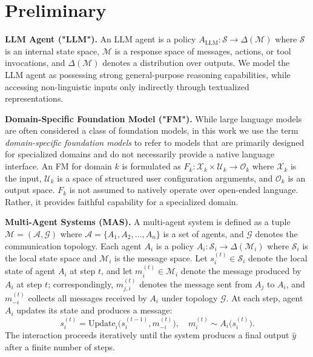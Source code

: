 \documentclass{llmxive}
\begin{document}
{\section{Preliminary}

\textbf{LLM Agent ("LLM").} An LLM agent \cite{DBLP:journals/fcsc/WangMFZYZCTCLZWW24, DBLP:journals/corr/abs-2503-21460} is a policy
$A_{\mathrm{LLM}} : \mathcal{S} \to \Delta(\mathcal{M})$
where $\mathcal{S}$ is an internal state space, $\mathcal{M}$ is a response space of messages, actions, or tool invocations, and $\Delta(\mathcal{M})$ denotes a distribution over outputs.
We model the LLM agent as possessing strong general-purpose reasoning capabilities, while accessing non-linguistic inputs only indirectly through textualized representations.

\textbf{Domain-Specific Foundation Model ("FM").} While large language models are often considered a class of foundation models, in this work we use the term \emph{domain-specific foundation models} to refer to models that are primarily designed for specialized domains and do not necessarily provide a native language interface. 
An FM for domain $k$ is formulated as
$F_k : \mathcal{X}_k \times \mathcal{U}_k \to \mathcal{O}_k$
where $\mathcal{X}_k$ is the input, $\mathcal{U}_k$ is a space of structured user configuration arguments, and $\mathcal{O}_k$ is an output space.
$F_k$ is not assumed to natively operate over open-ended language. Rather, it provides faithful capability for a specialized domain.


\textbf{Multi-Agent Systems (MAS).}
A multi-agent system is defined as a tuple $\mathcal{M} = (\mathcal{A}, \mathcal{G})$ where $\mathcal{A} = \{A_1, A_2, \dots, A_n\}$ is a set of agents, and $\mathcal{G}$ denotes the communication topology.
Each agent $A_i$ is a policy $A_i : \mathcal{S}_i \to \Delta(\mathcal{M}_i)$
where $\mathcal{S}_i$ is the local state space and $\mathcal{M}_i$ is the message space.
Let $s_i^{(t)} \in \mathcal{S}_i$ denote the local state of agent $A_i$ at step $t$, and let $m_i^{(t)} \in \mathcal{M}_i$ denote the message produced by $A_i$ at step $t$; correspondingly, $m_{j,i}^{(t)}$ denotes the message sent from $A_j$ to $A_i$, and $m_{-i}^{(t)}$ collects all messages received by $A_i$ under topology $\mathcal{G}$. At each step, agent $A_i$ updates its state and produces a message:
\begin{equation}
    s_i^{(t)} = \mathrm{Update}_i\big(s_i^{(t-1)}, m_{-i}^{(t)}\big), 
    \quad
    m_i^{(t)} \sim A_i\big(s_i^{(t)}\big).
\end{equation}
The interaction proceeds iteratively until the system produces a final output $\hat{y}$ after a finite number of steps.




}
\end{document}
